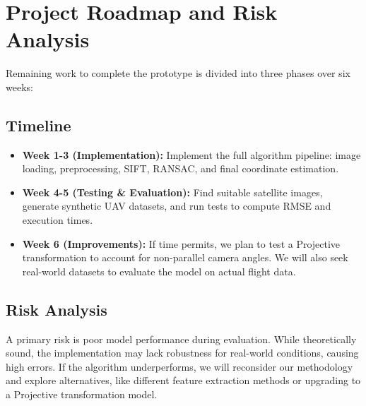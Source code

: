 \section{Project Roadmap and Risk Analysis}
Remaining work to complete the prototype is divided into three phases over six weeks:

\subsection{Timeline}

\begin{itemize}
    \item \textbf{Week 1-3 (Implementation):} Implement the full algorithm pipeline: image loading, preprocessing, SIFT, RANSAC, and final coordinate estimation.
    \item \textbf{Week 4-5 (Testing \& Evaluation):} Find suitable satellite images, generate synthetic UAV datasets, and run tests to compute RMSE and execution times.
    \item \textbf{Week 6 (Improvements):} If time permits, we plan to test a Projective transformation to account for non-parallel camera angles. We will also seek real-world datasets to evaluate the model on actual flight data.
\end{itemize}

\subsection{Risk Analysis}
A primary risk is poor model performance during evaluation. While theoretically sound, the implementation may lack robustness for real-world conditions, causing high errors. If the algorithm underperforms, we will reconsider our methodology and explore alternatives, like different feature extraction methods or upgrading to a Projective transformation model.
